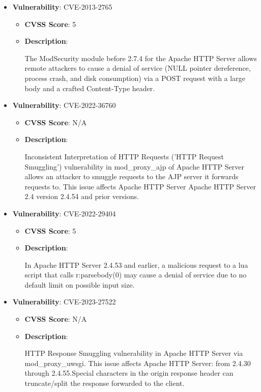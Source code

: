 \documentclass{article}
\begin{document}
\begin{itemize}
        \item \textbf{Vulnerability}: CVE-2013-2765
        \begin{itemize}
            \item \textbf{CVSS Score}:  5 
            \item \textbf{Description}:
            \parbox[t]{0.9\linewidth}{
                \ttfamily The ModSecurity module before 2.7.4 for the Apache HTTP Server allows remote attackers to cause a denial of service (NULL pointer dereference, process crash, and disk consumption) via a POST request with a large body and a crafted Content-Type header.
            }
        \end{itemize}
    
        \item \textbf{Vulnerability}: CVE-2022-36760
        \begin{itemize}
            \item \textbf{CVSS Score}:  N/A 
            \item \textbf{Description}:
            \parbox[t]{0.9\linewidth}{
                \ttfamily Inconsistent Interpretation of HTTP Requests ('HTTP Request Smuggling') vulnerability in mod\_proxy\_ajp of Apache HTTP Server allows an attacker to smuggle requests to the AJP server it forwards requests to.  This issue affects Apache HTTP Server Apache HTTP Server 2.4 version 2.4.54 and prior versions.
            }
        \end{itemize}
    
        \item \textbf{Vulnerability}: CVE-2022-29404
        \begin{itemize}
            \item \textbf{CVSS Score}:  5 
            \item \textbf{Description}:
            \parbox[t]{0.9\linewidth}{
                \ttfamily In Apache HTTP Server 2.4.53 and earlier, a malicious request to a lua script that calls r:parsebody(0) may cause a denial of service due to no default limit on possible input size.
            }
        \end{itemize}
    
        \item \textbf{Vulnerability}: CVE-2023-27522
        \begin{itemize}
            \item \textbf{CVSS Score}:  N/A 
            \item \textbf{Description}:
            \parbox[t]{0.9\linewidth}{
                \ttfamily HTTP Response Smuggling vulnerability in Apache HTTP Server via mod\_proxy\_uwsgi. This issue affects Apache HTTP Server: from 2.4.30 through 2.4.55.Special characters in the origin response header can truncate/split the response forwarded to the client.
            }
        \end{itemize}
    

\end{itemize}
\end{document}
